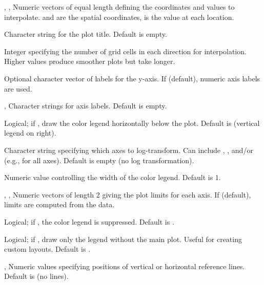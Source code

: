 \documentclass[a4paper]{book}
\begin{document}
%
\begin{Arguments}
\begin{ldescription}
\item[\code{x}, \code{y}, \code{z}] Numeric vectors of equal length defining the coordinates and
values to interpolate.  and  are the spatial coordinates,
 is the value at each location.

\item[\code{main}] Character string for the plot title. Default is empty.

\item[\code{N}] Integer specifying the number of grid cells in each direction for
interpolation. Higher values produce smoother plots but take longer.

\item[\code{yaxt}] Optional character vector of labels for the y-axis. If 
(default), numeric axis labels are used.

\item[\code{xlab}, \code{ylab}] Character strings for axis labels. Default is empty.

\item[\code{horizontal}] Logical; if , draw the color legend horizontally
below the plot. Default is  (vertical legend on right).

\item[\code{useLog}] Character string specifying which axes to log-transform.
Can include , , and/or  (e.g., 
for all axes). Default is empty (no log transformation).

\item[\code{legend.width}] Numeric value controlling the width of the color legend.
Default is 1.

\item[\code{xlim}, \code{ylim}, \code{zlim}] Numeric vectors of length 2 giving the plot limits for
each axis. If  (default), limits are computed from the data.

\item[\code{add.legend}] Logical; if , the color legend is suppressed.
Default is .

\item[\code{legend.only}] Logical; if , draw only the legend without the
main plot. Useful for creating custom layouts. Default is .

\item[\code{vline}, \code{hline}] Numeric values specifying positions of vertical or
horizontal reference lines. Default is  (no lines).


\end{ldescription}
\end{Arguments}
\end{document}
